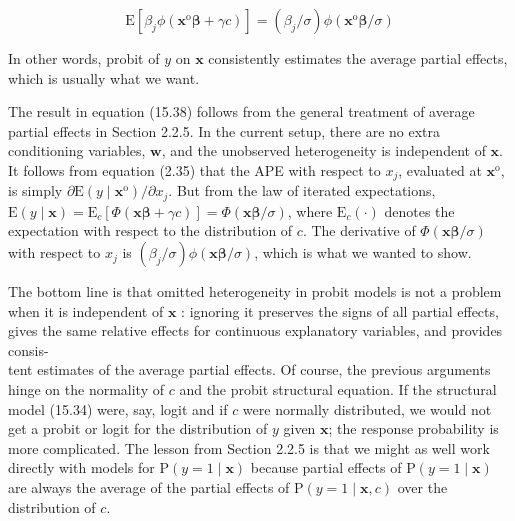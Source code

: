 \documentclass[10pt]{article}
\begin{document}
\begin{equation*}
\mathrm{E}\left[\beta_{j} \phi\left(\mathbf{x}^{\mathrm{o}} \boldsymbol{\beta}+\gamma c\right)\right]=\left(\beta_{j} / \sigma\right) \phi\left(\mathbf{x}^{\mathrm{o}} \boldsymbol{\beta} / \sigma\right) \tag{15.38}
\end{equation*}


In other words, probit of $y$ on $\mathbf{x}$ consistently estimates the average partial effects, which is usually what we want.

The result in equation (15.38) follows from the general treatment of average partial effects in Section 2.2.5. In the current setup, there are no extra conditioning variables, $\mathbf{w}$, and the unobserved heterogeneity is independent of $\mathbf{x}$. It follows from equation (2.35) that the APE with respect to $x_{j}$, evaluated at $\mathbf{x}^{\mathrm{o}}$, is simply $\partial \mathrm{E}\left(y \mid \mathbf{x}^{\mathrm{o}}\right) / \partial x_{j}$. But from the law of iterated expectations, $\mathrm{E}(y \mid \mathbf{x})=\mathrm{E}_{c}[\Phi(\mathbf{x} \boldsymbol{\beta}+\gamma c)]=\Phi(\mathbf{x} \boldsymbol{\beta} / \sigma)$, where $\mathrm{E}_{c}(\cdot)$ denotes the expectation with respect to the distribution of $c$. The derivative of $\Phi(\mathbf{x} \boldsymbol{\beta} / \sigma)$ with respect to $x_{j}$ is $\left(\beta_{j} / \sigma\right) \phi(\mathbf{x} \boldsymbol{\beta} / \sigma)$, which is what we wanted to show.

The bottom line is that omitted heterogeneity in probit models is not a problem when it is independent of $\mathbf{x}$ : ignoring it preserves the signs of all partial effects, gives the same relative effects for continuous explanatory variables, and provides consis-\\
tent estimates of the average partial effects. Of course, the previous arguments hinge on the normality of $c$ and the probit structural equation. If the structural model (15.34) were, say, logit and if $c$ were normally distributed, we would not get a probit or logit for the distribution of $y$ given $\mathbf{x}$; the response probability is more complicated. The lesson from Section 2.2.5 is that we might as well work directly with models for $\mathrm{P}(y=1 \mid \mathbf{x})$ because partial effects of $\mathrm{P}(y=1 \mid \mathbf{x})$ are always the average of the partial effects of $\mathrm{P}(y=1 \mid \mathbf{x}, c)$ over the distribution of $c$.
\end{document}
